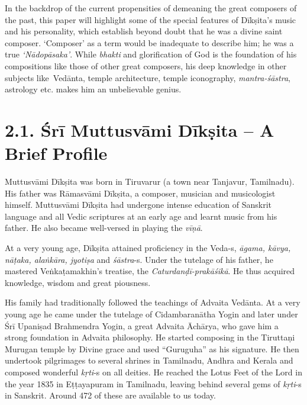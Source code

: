 In the backdrop of the current propensities of demeaning the great composers of the past, this paper will highlight some of the special features of Dīkṣita’s music and his personality, which establish beyond doubt that he was a divine saint composer. ‘Composer’ as a term would be inadequate to describe him; he was a true \textit{‘Nādopāsaka’}. While \textit{bhakti} and glorification of God is the foundation of his compositions like those of other great composers, his deep knowledge in other subjects like Vedānta, temple architecture, temple iconography, \textit{mantra-śāstra}, astrology etc. makes him an unbelievable genius.


\section*{2.1. Śrī Muttusvāmi Dīkṣita – A Brief Profile}

Muttusvāmi Dīkṣita was born in Tiruvarur (a town near Tanjavur, Tamilnadu). His father was Rāmasvāmi Dīkṣita, a composer, musician and musicologist himself. Muttusvāmi Dīkṣita had undergone intense education of Sanskrit language and all Vedic scriptures at an early age and learnt music from his father. He also became well-versed in playing the \textit{vīṇā}.

At a very young age, Dīkṣita attained proficiency in the Veda-s, \textit{āgama, kāvya, nāṭaka, alaṅkāra, jyotiṣa} and \textit{śāstra}-s. Under the tutelage of his father, he mastered Veṅkaṭamakhin’s treatise, the \textit{Caturdanḍī-prakāśikā}. He thus acquired knowledge, wisdom and great piousness.

His family had traditionally followed the teachings of Advaita Vedānta. At a very young age he came under the tutelage of Cidambaranātha Yogin and later under Śrī Upaniṣad Brahmendra Yogin, a great Advaita Āchārya, who gave him a strong foundation in Advaita philosophy. He started composing in the Tiruttaṇi Murugan temple by Divine grace and used “Guruguha” as his signature. He then undertook pilgrimages to several shrines in Tamilnadu, Andhra and Kerala and composed wonderful \textit{kṛti}-s on all deities. He reached the Lotus Feet of the Lord in the year 1835 in Eṭṭayapuram in Tamilnadu, leaving behind several gems of \textit{kṛti}-s in Sanskrit. Around 472 of these are available to us today.

